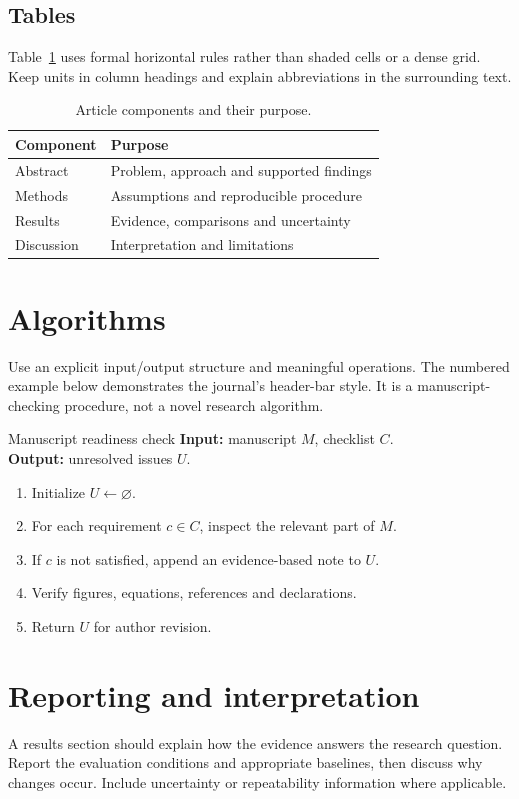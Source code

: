 \documentclass{jecde}
\begin{document}
\subsection{Tables}
Table~\ref{tab:components} uses formal horizontal rules rather than shaded cells or a dense grid. Keep units in column headings and explain abbreviations in the surrounding text.
\begin{table}[ht]
\centering\caption{Article components and their purpose.}\label{tab:components}
\small\begin{tabularx}{\columnwidth}{@{}lX@{}}\toprule
Component & Purpose\\\midrule
Abstract & Problem, approach and supported findings\\
Methods & Assumptions and reproducible procedure\\
Results & Evidence, comparisons and uncertainty\\
Discussion & Interpretation and limitations\\\bottomrule
\end{tabularx}
\end{table}

\section{Algorithms}
Use an explicit input/output structure and meaningful operations. The numbered example below demonstrates the journal's header-bar style. It is a manuscript-checking procedure, not a novel research algorithm.
\begin{jecalgorithm}{Manuscript readiness check}\label{alg:check}
\textbf{Input:} manuscript $M$, checklist $C$.\\
\textbf{Output:} unresolved issues $U$.
\begin{enumerate}[label=\arabic*.,leftmargin=1.4em]
\item Initialize $U\leftarrow\varnothing$.
\item For each requirement $c\in C$, inspect the relevant part of $M$.
\item If $c$ is not satisfied, append an evidence-based note to $U$.
\item Verify figures, equations, references and declarations.
\item Return $U$ for author revision.
\end{enumerate}
\end{jecalgorithm}



\section{Reporting and interpretation}
A results section should explain how the evidence answers the research question. Report the evaluation conditions and appropriate baselines, then discuss why changes occur. Include uncertainty or repeatability information where applicable.
\end{document}
